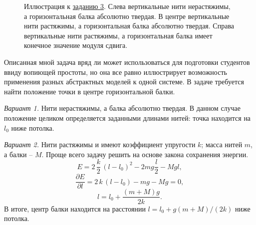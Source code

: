 \documentclass[a4paper, 12pt]{article}
\begin{document}
\begin{figure}[b]
	\caption{Иллюстрация к \hyperref[task3]{заданию 3}. Слева вертикальные 
	нити нерастяжимы, а горизонтальная балка абсолютно твердая. В центре 
	вертикальные нити растяжимы, а горизонтальная балка абсолютно твердая. 
	Справа вертикальные нити растяжимы, а горизонтальная балка имеет 
	конечное значение модуля сдвига.}
	\label{fig:abstract}
\end{figure}%

Описанная мной задача вряд ли может использоваться для подготовки 
студентов ввиду вопиющей простоты, но она все равно иллюстрирует 
возможность применения разных абстрактных моделей к одной системе. 
В задаче требуется найти положение точки в центре горизонтальной балки.

\textit{Вариант 1.} Нити нерастяжимы, а балка абсолютно твердая. 
В данном случае положение целиком определяется заданными длинами нитей: 
точка находится на $l_0$ ниже потолка.

\textit{Вариант 2.} Нити растяжимы и имеют коэффициент упругости $k$; 
масса нитей $m$, а балки -- $M$. Проще всего задачу решить на основе 
закона сохранения энергии.
$$ E = 2\,\frac{k}{2}\,(l - l_0)^2 - 2mg\frac{l}{2} - Mgl, $$
$$ \frac{\partial E}{\partial l} = 2\,k\,(l - l_0) - mg - Mg = 0, $$
$$ l = l_0 + \frac{(m+M)g}{2k}. $$
В итоге, центр балки находится на расстоянии $l = l_0 + g(m+M)/(2k)$ 
ниже потолка.
\end{document}
